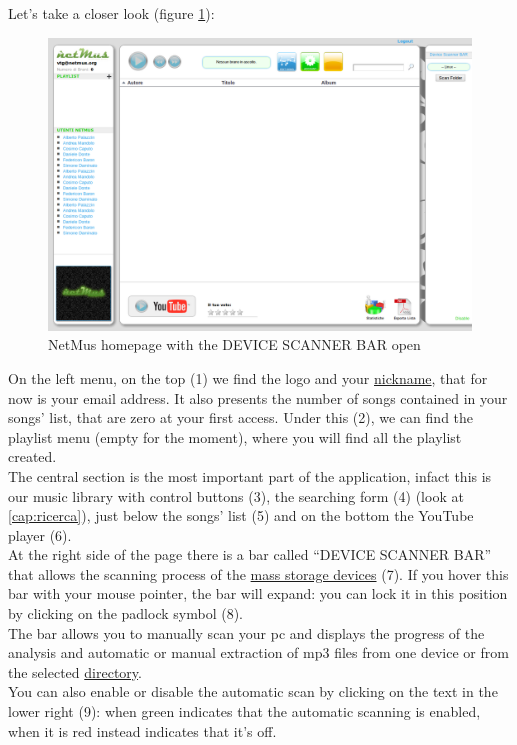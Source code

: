 Let's take a closer look (figure \ref{fig:appletbarAperta}):\\
\begin{figure}[!htbp]
  \centering
  \includegraphics[width=14cm]{img/MU/applet_bar_open.png}
\caption{NetMus homepage with the DEVICE SCANNER BAR open}
\label{fig:appletbarAperta}
\end{figure} 

On the left menu, on the top (1) we find the  logo and
your \underline{nickname}, that for now is your email address. It also presents
the number of songs contained in your songs' list, that are zero at your first
access. Under this (2), we can find the playlist menu (empty for the moment),
where you will find all the playlist created.\\

The central section is the most important part of the application, infact this
is our music library with control buttons (3), the searching form (4) (look at
\ref{cap:ricerca}), just below the songs' list (5) and on the bottom the
YouTube player (6).\\

At the right side of the page there is a bar called ``DEVICE SCANNER BAR'' that
allows the scanning process of the \underline{mass storage devices} (7). If you
hover this bar with your mouse pointer, the bar will expand: you can lock it in
this position by clicking on the padlock symbol (8).\\
The bar allows you to manually scan your pc and displays the progress of the
analysis and automatic or manual extraction of mp3 files from one device or from
the selected \underline{directory}.\\
You can also enable or disable the automatic scan by clicking on the text in the
lower right (9): when green indicates that the
automatic scanning is enabled, when it is red instead indicates that it's
off.

